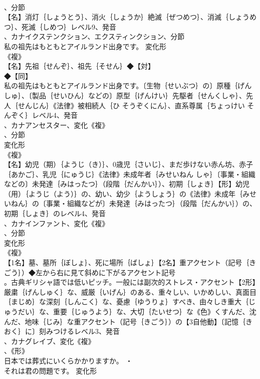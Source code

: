 \documentclass[8pt]{extreport}
\begin{document}
\begin{CJK}{UTF8}{min}
\\	、分節
\\	【名】消灯｛しょうとう｝、消火｛しょうか｝絶滅｛ぜつめつ｝、消滅｛しょうめつ｝、死滅｛しめつ｝レベル9、発音
\\	、カナイクステンクション、エクスティンクション、分節
\\	私の祖先はもともとアイルランド出身です。	変化形 
\\	《複》
\\	【名】先祖｛せんぞ｝、祖先｛そせん｝◆【対】
\\	◆【同】
\\	私の祖先はもともとアイルランド出身です。〔生物｛せいぶつ｝の〕原種｛げんしゅ｝、〔製品｛せいひん｝などの〕原型｛げんけい｝先駆者｛せんくしゃ｝、先人｛せんじん｝《法律》被相続人｛ひ そうぞくにん｝、直系尊属｛ちょっけい そんぞく｝レベル4、発音
\\	、カナアンセスター、変化《複》
\\	、分節
\\	変化形 
\\	《複》
\\	【名】幼児（期）｛ようじ（き）｝、0歳児｛さいじ｝、まだ歩けない赤ん坊、赤子｛あかご｝、乳児｛にゅうじ｝《法律》未成年者｛みせいねん しゃ｝〔事業・組織などの〕未発達｛みはったつ｝（段階｛だんかい｝）、初期｛しょき｝【形】幼児（用）｛ようじ（よう）｝の、幼い、幼少｛ようしょう｝の《法律》未成年｛みせいねん｝の〔事業・組織などが〕未発達｛みはったつ｝（段階｛だんかい｝）の、初期｛しょき｝のレベル4、発音
\\	、カナインファント、変化《複》
\\	、分節
\\	変化形 
\\	《複》
\\	【1名】墓、墓所｛ぼしょ｝、死に場所｛ばしょ｝【2名】重アクセント（記号｛きごう｝）◆左から右に見て斜めに下がるアクセント記号
\\	。古典ギリシャ語では低いピッチ。一般には副次的ストレス・アクセント【2形】厳粛｛げんしゅく｝な、威厳｛いげん｝のある、重々しい、いかめしい、真面目｛まじめ｝な深刻｛しんこく｝な、憂慮｛ゆうりょ｝すべき、由々しき重大｛じゅうだい｝な、重要｛じゅうよう｝な、大切｛たいせつ｝な《色》くすんだ、沈んだ、地味｛じみ｝な重アクセント（記号｛きごう｝）の【3自他動】〔記憶｛きおく｝に〕刻みつけるレベル3、発音
\\	、カナグレイブ、変化《複》
\\	、《形》
\\	日本では葬式にいくらかかりますか。 ・
\\	それは君の問題です。	変化形 

\end{CJK}
\end{document}
